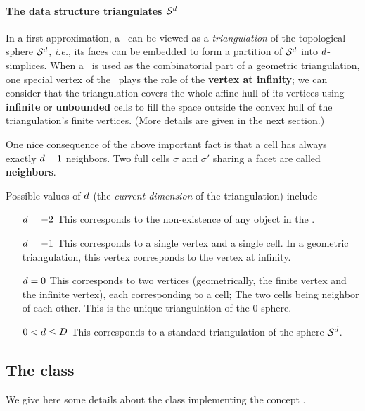 \paragraph{The data structure triangulates $\mathcal S^{d}$}

In a first approximation, a \tds\ can be viewed as
a \emph{triangulation} of the topological sphere $\mathcal S^{d}$,
\emph{i.e.}, its faces can be embedded to form a partition of
$\mathcal S^{d}$ into $d$-simplices. When a 
\tds\ is used as the combinatorial part of a geometric triangulation, one
special vertex of the \tds\ plays the role of the \textbf{vertex at
infinity}; we can consider that the triangulation covers the whole
affine hull of its vertices
using \textbf{infinite} or \textbf{unbounded} cells to fill the space  outside the convex
hull of the triangulation's finite vertices. (More details are given in the next section.)


One nice consequence of the above important fact is that a cell has
always exactly  $d+1$ neighbors.
Two  full cells $\sigma$ and $\sigma'$ sharing a facet are called
\textbf{neighbors}.


Possible values of $d$ (the \emph{current dimension} of the triangulation) include
\begin{itemize}
\item[$d=-2$] This corresponds to the non-existence of any object in
  the \tds.
\item[$d=-1$] This corresponds to a single vertex and a single cell. In a
geometric triangulation, this vertex corresponds to the vertex at infinity.
\item[$d=0$] This corresponds to two vertices (geometrically, the finite vertex and
  the infinite vertex), each corresponding to  a cell;
The two cells being neighbor of each other. This is the unique
triangulation of the $0$-sphere.
\item[$0<d\le D$] This corresponds to a standard triangulation of
the sphere $\mathcal S^{d}$.
\end{itemize}


\subsection{The class \label{triangulation:tds:impl}}

We give here some details about the class
implementing the concept .


